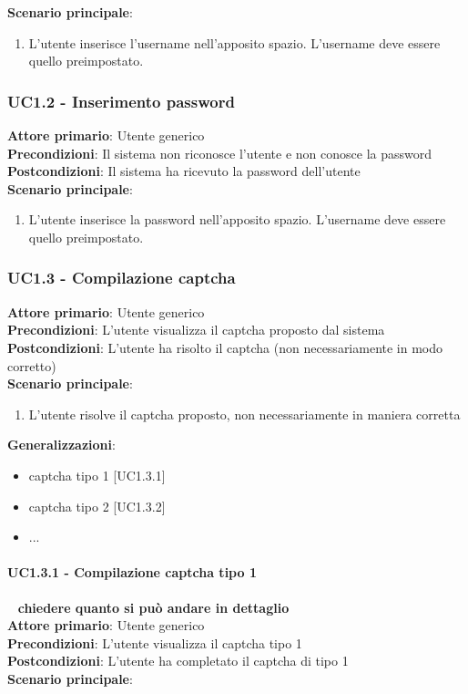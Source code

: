 \textbf{Scenario principale}:
\begin{enumerate}
   \item L'utente inserisce l'username nell'apposito spazio. L'username deve essere quello preimpostato.
\end{enumerate}

\subsubsection{UC1.2 - Inserimento password}
\textbf{Attore primario}: Utente generico\\
\textbf{Precondizioni}: Il sistema non riconosce l'utente e non conosce la password\\
\textbf{Postcondizioni}: Il sistema ha ricevuto la password dell'utente\\

\textbf{Scenario principale}:
\begin{enumerate}
   \item L'utente inserisce la password nell'apposito spazio. L'username deve essere quello preimpostato.
\end{enumerate}

\subsubsection{UC1.3 - Compilazione captcha}
\textbf{Attore primario}: Utente generico\\
\textbf{Precondizioni}: L'utente visualizza il captcha proposto dal sistema\\
\textbf{Postcondizioni}: L'utente ha risolto il captcha (non necessariamente in modo corretto)\\

\textbf{Scenario principale}:
\begin{enumerate}
   \item L'utente risolve il captcha proposto, non necessariamente in maniera corretta
\end{enumerate}
\textbf{Generalizzazioni}:
\begin{itemize}
   \item captcha tipo 1 [UC1.3.1]
   \item captcha tipo 2 [UC1.3.2]
   \item ...
\end{itemize}

\paragraph{UC1.3.1 - Compilazione captcha tipo 1 }~\smallskip
\textbf{chiedere quanto si può andare in dettaglio}\\
\textbf{Attore primario}: Utente generico\\
\textbf{Precondizioni}: L'utente visualizza il captcha tipo 1\\
\textbf{Postcondizioni}: L'utente ha completato il captcha di tipo 1\\
\textbf{Scenario principale}:

